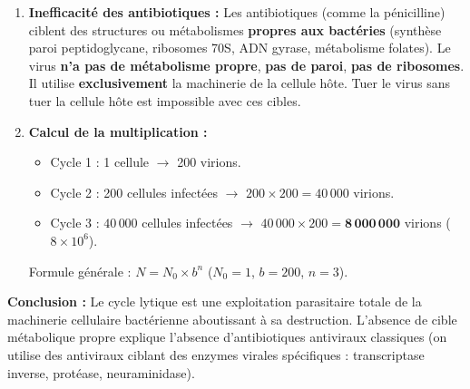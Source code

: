 \documentclass[11pt]{article}
\begin{document}
\begin{exoresolu}
\begin{enumerate}
\begin{itemize}
              \end{itemize}
        \item \textbf{Inefficacité des antibiotiques :} Les antibiotiques (comme la pénicilline) ciblent des structures ou métabolismes \textbf{propres aux bactéries} (synthèse paroi peptidoglycane, ribosomes 70S, ADN gyrase, métabolisme folates). Le virus \textbf{n'a pas de métabolisme propre}, \textbf{pas de paroi}, \textbf{pas de ribosomes}. Il utilise \textbf{exclusivement} la machinerie de la cellule hôte. Tuer le virus sans tuer la cellule hôte est impossible avec ces cibles.
        \item \textbf{Calcul de la multiplication :}
              \begin{itemize}
                  \item Cycle 1 : 1 cellule $\rightarrow$ 200 virions.
                  \item Cycle 2 : 200 cellules infectées $\rightarrow$ $200 \times 200 = 40\,000$ virions.
                  \item Cycle 3 : $40\,000$ cellules infectées $\rightarrow$ $40\,000 \times 200 = \mathbf{8\,000\,000}$ virions ($8 \times 10^6$).
              \end{itemize}
              Formule générale : $N = N_0 \times b^n$ ($N_0=1$, $b=200$, $n=3$).
    \end{enumerate}
    \textbf{Conclusion :} Le cycle lytique est une exploitation parasitaire totale de la machinerie cellulaire bactérienne aboutissant à sa destruction. L'absence de cible métabolique propre explique l'absence d'antibiotiques antiviraux classiques (on utilise des antiviraux ciblant des enzymes virales spécifiques : transcriptase inverse, protéase, neuraminidase).
\end{exoresolu}
\end{document}
